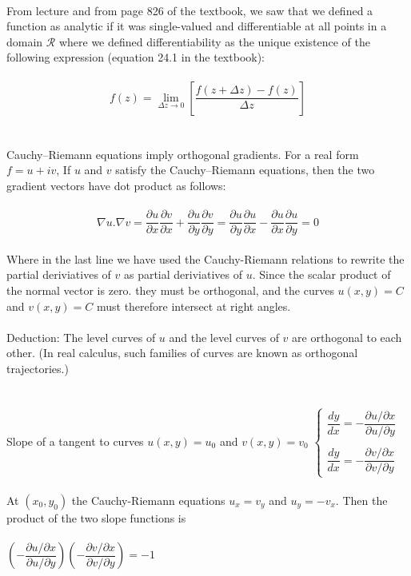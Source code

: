 \documentclass[fleqn]{article}
\begin{document}
\begin{enumerate}
    \textcolor{hwColor}{
      \\
      From lecture and from page 826 of the textbook, we saw that we defined a function as analytic 
      if it was single-valued and differentiable at all points in a domain $\mathcal{R}$ where we defined differentiability 
      as the unique existence of the following expression (equation 24.1 in the textbook): \\
      \\
      $$f(z)=\lim\limits_{\Delta z \to 0} \left[\dfrac{f(z+\Delta z)-f(z)}{\Delta z}\right]$$ \\
      \\
      Cauchy–Riemann equations imply orthogonal gradients. For a real form $f=u+i v$, If $u$ and $v$ satisfy 
      the Cauchy–Riemann equations, then the two gradient vectors have dot product as follows: \\
      \\
      $$\nabla u. \nabla v
      =\dfrac{\partial u}{\partial x} \dfrac{\partial v}{\partial x}+\dfrac{\partial u}{\partial y} \dfrac{\partial v}{\partial y}
      =\dfrac{\partial u}{\partial y} \dfrac{\partial u}{\partial x}-\dfrac{\partial u}{\partial x}\dfrac{\partial u}{\partial y}
      =0$$
      \\
      Where in the last line we have used the Cauchy-Riemann relations to rewrite the partial 
      deriviatives of $v$ as partial deriviatives of $u$. Since the scalar product of the 
      normal vector is zero. they must be orthogonal, and the curves $u(x,y)=C$ and $v(x,y)=C$ must
      therefore intersect at right angles. \\
      \\
      Deduction: The level curves of $u$ and the level curves of $v$ are orthogonal to each other.
      (In real calculus, such families of curves are known as orthogonal trajectories.) 
      \\
      \\
      \\
      Slope of a tangent to curves $u(x,y)=u_0$ and $v(x,y)=v_0$
      $
        \begin{cases}
          \dfrac{dy}{dx}=-\dfrac{\partial u/\partial x}{\partial u/\partial y} \\
          \\
          \dfrac{dy}{dx}=-\dfrac{\partial v/\partial x}{\partial v/\partial y}
        \end{cases}
      $ \\ 
      \\
      At $(x_0, y_0)$ the Cauchy-Riemann equations $u_x=v_y$ and $u_y=-v_x$. Then the product 
      of the two slope functions is \\ \\ 
      $
        \left(-\dfrac{\partial u/\partial x}{\partial u/\partial y}\right)  \left(-\dfrac{\partial v/\partial x}{\partial v/\partial y}\right)=-1
      $ 
    }

  \end{enumerate}
\end{document}
